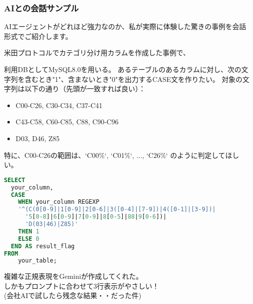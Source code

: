 \documentclass[uplatex,dvipdfmx,9pt,a4paper]{beamer}
\begin{document}
\begin{frame}
  \frametitle{AIとの会話サンプル}
  
  AIエージェントがどれほど強力なのか、私が実際に体験した驚きの事例を会話形式でご紹介します。\\
  \vspace{0.5cm}

  米田プロトコルでカテゴリ分け用カラムを作成した事例で、
  \begin{mychat}
    利用DBとしてMySQL8.0を用いる。
    あるテーブルのあるカラムに対し、次の文字列を含むとき"1"、含まないとき"0"を出力するCASE文を作りたい。
    対象の文字列は以下の通り（先頭が一致すれば良い）：
    \begin{itemize}
        \item C00-C26, C30-C34, C37-C41
        \item C43-C58, C60-C85, C88, C90-C96
        \item D03, D46, Z85
    \end{itemize}
    特に、C00-C26の範囲は、`C00\%`, `C01\%`, ..., `C26\%` のように判定してほしい。
  \end{mychat}

  \begin{aichat}
    \begin{lstlisting}[language=SQL, basicstyle=\scriptsize\ttfamily, frame=none, upquote=true]
SELECT
  your_column,
  CASE
    WHEN your_column REGEXP
    '^(C(0[0-9]|1[0-9]|2[0-6]|3([0-4]|[7-9])|4([0-1]|[3-9])|
      '5[0-8]|6[0-9]|7[0-9]|8[0-5]|88|9[0-6])|
      'D(03|46)|Z85)'
    THEN 1
    ELSE 0
  END AS result_flag
FROM
    your_table;
\end{lstlisting}
  \end{aichat}

  複雑な正規表現をGeminiが作成してくれた。\\
  しかもプロンプトに合わせて3行表示がやさしい！\\
  (会社AIで試したら残念な結果・・だった件)

\end{frame}
\end{document}
